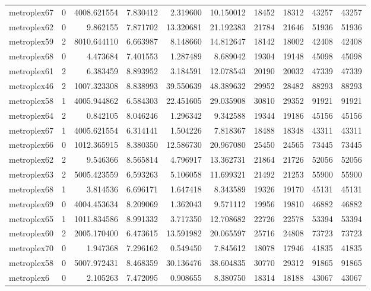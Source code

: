 \begin{longtable}{|l|r|r|r|r|r|r|r|r|r|}
metroplex67 & 0 & 4008.621554 & 7.830412 & 2.319600 & 10.150012 & 18452 & 18312 & 43257 & 43257 \\
metroplex62 & 0 & 9.862155 & 7.871702 & 13.320681 & 21.192383 & 21784 & 21646 & 51936 & 51936 \\
metroplex59 & 2 & 8010.644110 & 6.663987 & 8.148660 & 14.812647 & 18142 & 18002 & 42408 & 42408 \\
metroplex68 & 0 & 4.473684 & 7.401553 & 1.287489 & 8.689042 & 19304 & 19148 & 45098 & 45098 \\
metroplex61 & 2 & 6.383459 & 8.893952 & 3.184591 & 12.078543 & 20190 & 20032 & 47339 & 47339 \\
metroplex46 & 2 & 1007.323308 & 8.838993 & 39.550639 & 48.389632 & 29952 & 28482 & 88293 & 88293 \\
metroplex58 & 1 & 4005.944862 & 6.584303 & 22.451605 & 29.035908 & 30810 & 29352 & 91921 & 91921 \\
metroplex64 & 2 & 0.842105 & 8.046246 & 1.296342 & 9.342588 & 19344 & 19186 & 45156 & 45156 \\
metroplex67 & 1 & 4005.621554 & 6.314141 & 1.504226 & 7.818367 & 18488 & 18348 & 43311 & 43311 \\
metroplex66 & 0 & 1012.365915 & 8.380350 & 12.586730 & 20.967080 & 25450 & 24565 & 73445 & 73445 \\
metroplex62 & 2 & 9.546366 & 8.565814 & 4.796917 & 13.362731 & 21864 & 21726 & 52056 & 52056 \\
metroplex63 & 2 & 5005.423559 & 6.593263 & 5.106058 & 11.699321 & 21492 & 21253 & 55900 & 55900 \\
metroplex68 & 1 & 3.814536 & 6.696171 & 1.647418 & 8.343589 & 19326 & 19170 & 45131 & 45131 \\
metroplex69 & 0 & 4004.453634 & 8.209069 & 1.362043 & 9.571112 & 19956 & 19810 & 46882 & 46882 \\
metroplex65 & 1 & 1011.834586 & 8.991332 & 3.717350 & 12.708682 & 22726 & 22578 & 53394 & 53394 \\
metroplex60 & 2 & 2005.170400 & 6.473615 & 13.591982 & 20.065597 & 25716 & 24808 & 73723 & 73723 \\
metroplex70 & 0 & 1.947368 & 7.296162 & 0.549450 & 7.845612 & 18078 & 17946 & 41835 & 41835 \\
metroplex58 & 0 & 5007.972431 & 8.468359 & 30.136476 & 38.604835 & 30770 & 29312 & 91865 & 91865 \\
metroplex6 & 0 & 2.105263 & 7.472095 & 0.908655 & 8.380750 & 18314 & 18188 & 43067 & 43067 \\

\end{longtable}
